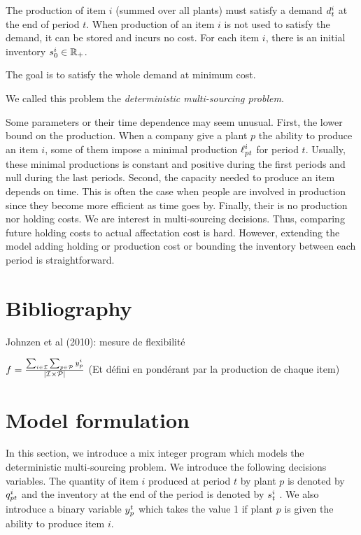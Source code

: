 The production of item $i$ (summed over all plants) must satisfy a demand $d_t^i$ at the end of period $t$.
When production of an item $i$ is not used to satisfy the demand, it can be stored and incurs no cost.
For each item $i$, there is an initial inventory $s_0^i\in\mathbb{R}_+$.


The goal is to satisfy the whole demand at minimum cost.


We called this problem the \emph{deterministic multi-sourcing problem}.


\medskip


Some parameters or their time dependence may seem unusual.
First, the lower bound on the production.
When a company give a plant $p$ the ability to produce an item $i$, some of them impose a minimal production $\ell_{pt}^i$ for period $t$.
Usually, these minimal productions is constant and positive during the first periods and null during the last periods.
Second, the capacity needed to produce an item depends on time.
This is often the case when people are involved in production since they become more efficient as time goes by.
Finally, their is no production nor holding costs.
We are interest in multi-sourcing decisions.
Thus, comparing future holding costs to actual affectation cost is hard.
However, extending the model adding holding or production cost or bounding the inventory between each period is straightforward.


\section{Bibliography}



Johnzen et al (2010): mesure de flexibilité
 
$f=\frac{\sum_{i\in\REF}\sum_{p\in\plants}\open_p^i}{\card{\REF\times\plants}}$ (Et défini en pondérant par la production de chaque item)


\section{Model formulation}


In this section, we introduce a mix integer program which models the deterministic multi-sourcing problem.
We introduce the following decisions variables.
The quantity of item $i$ produced at period $t$ by plant $p$ is denoted by $q_{pt}^i$ and the inventory at the end of the period is denoted by $s_t^i$ .
We also introduce a binary variable $y_p^t$ which takes the value 1 if plant $p$ is given the ability to produce item $i$.


